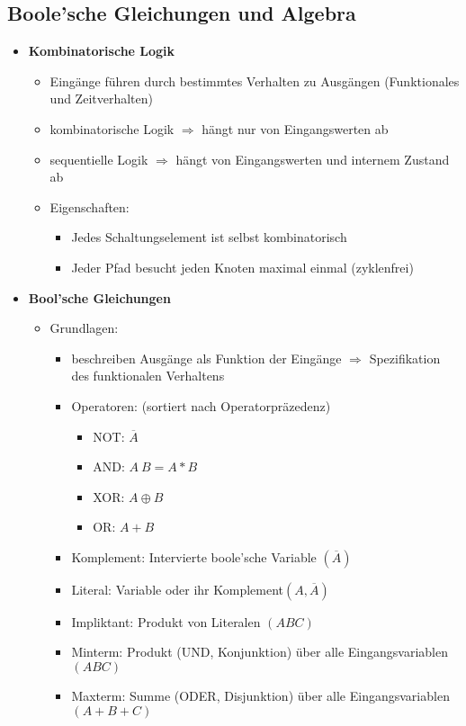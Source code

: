 \subsection{Boole'sche Gleichungen und Algebra}
\begin{itemize}
\item \textbf{Kombinatorische Logik}
	\begin{itemize}
	\item Eingänge führen durch bestimmtes Verhalten zu Ausgängen (Funktionales und Zeitverhalten)
	\item kombinatorische Logik $\Rightarrow$ hängt nur von Eingangswerten ab
	\item sequentielle Logik $\Rightarrow$ hängt von Eingangswerten und internem Zustand ab
	\item Eigenschaften:
		\begin{itemize}
		\item Jedes Schaltungselement ist selbst kombinatorisch
		\item Jeder Pfad besucht jeden Knoten maximal einmal (zyklenfrei)
		\end{itemize}
	\end{itemize}
	
\item \textbf{Bool'sche Gleichungen}
	\begin{itemize}
	\item Grundlagen:
		\begin{itemize}
		\item beschreiben Ausgänge als Funktion der Eingänge $\Rightarrow$ Spezifikation des funktionalen Verhaltens
		\item Operatoren: (sortiert nach Operatorpräzedenz)
			\begin{itemize}
			\item NOT: $\overline{A}$
			\item AND: $A~B=A*B$
			\item XOR: $A \oplus B$
			\item OR: $A+B$
			\end{itemize}
		\item Komplement: Intervierte boole'sche Variable $(\overline{A})$
		\item Literal: Variable oder ihr Komplement$(A, \overline{A})$
		\item Impliktant: Produkt von Literalen $(ABC)$
		\item Minterm: Produkt (UND, Konjunktion) über alle Eingangsvariablen $(ABC)$
		\item Maxterm: Summe (ODER, Disjunktion) über alle Eingangsvariablen $(A+B+C)$
		\end{itemize}
		

\end{itemize}
\end{itemize}
